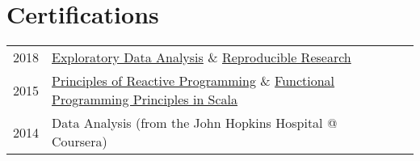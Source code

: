 \documentclass[letterpaper]{deedy-resume} %
\begin{document}
\begin{minipage}[t]{0.66\textwidth}



\sectionspace %


\section{Certifications}

\begin{tabular}{rll}
	2018 & \href{https://www.coursera.org/account/accomplishments/verify/67MDDEUHCDET}{Exploratory Data Analysis} \& \href{https://www.coursera.org/account/accomplishments/verify/S3UGZPCKZ8LJ}{Reproducible Research} \\
	2015 & \href{https://www.coursera.org/account/accomplishments/verify/WEJXAN6VWQ}{Principles of Reactive Programming} \& \href{https://www.coursera.org/account/accomplishments/certificate/CKRUBZNHR9}{Functional Programming Principles in Scala} \\
	2014 & Data Analysis (from the John Hopkins Hospital @ Coursera) \\
\end{tabular}



\end{minipage} %








\end{document}
